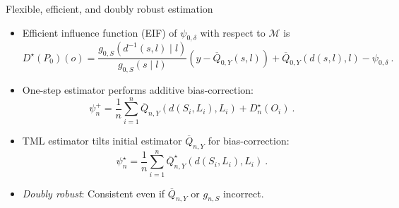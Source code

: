 \documentclass{beamer}
\begin{document}

\begin{frame}[c]{Flexible, efficient, and doubly robust estimation}

\begin{center}
\begin{itemize}
  \itemsep8pt
  \item Efficient influence function (EIF) of $\psi_{0, \delta}$ with respect to
    $\mathcal{M}$ is
    \begin{equation*}
      D^{\star}(P_0)(o) = \frac{g_{0,S}(d^{-1}(s,l) \mid l)}
      {g_{0,S}(s \mid l)} ({y - \overline{Q}_{0,Y}(s,l)}) +
      \overline{Q}_{0,Y}(d(s,l), l) - \psi_{0,\delta} \ .
    \end{equation*}
  \item One-step estimator performs additive bias-correction:
    \begin{equation*}\label{tmle}
        \psi_n^{+} = \frac{1}{n} \sum_{i = 1}^n \overline{Q}_{n,Y}(d(S_i, L_i),
        L_i) + D^{\star}_n(O_i) \ .
      \end{equation*}
  \item TML estimator tilts initial estimator $\overline{Q}_{n,Y}$ for
    bias-correction:
    \begin{equation*}\label{tmle}
      \psi_n^{\star} = \frac{1}{n} \sum_{i = 1}^n
      \overline{Q}_{n,Y}^{\star}(d(S_i, L_i), L_i) \ .
      \end{equation*}
  \item \textit{Doubly robust}: Consistent even if $\overline{Q}_{n,Y}$ or
   $g_{n,S}$ incorrect.
\end{itemize}
\end{center}


\end{frame}
\end{document}
